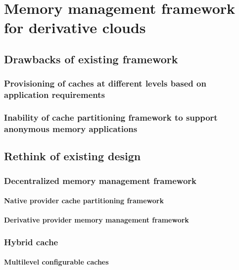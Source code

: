 \chapter{Memory management framework for derivative clouds}
 
  \section{Drawbacks of existing framework}
  
    \subsection{Provisioning of caches at different levels based on application requirements}
      
  
    \subsection{Inability of cache partitioning framework to support anonymous memory applications}    
    

  \section{Rethink of existing design}
  
    \subsection{Decentralized memory management framework}
	      
      \subsubsection{Native provider cache partitioning framework}

      \subsubsection{Derivative provider memory management framework}	

    \subsection{Hybrid cache}
      
      \subsubsection{Multilevel configurable caches}
      
